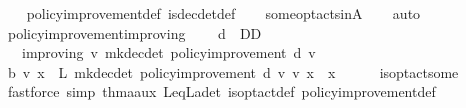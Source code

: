 \begin{isabellebody}
%
\isadelimproof
\ \ %
\endisadelimproof
%
\isatagproof
{}\isamarkupfalse%
\ policy{\isacharunderscore}{\kern0pt}improvement{\isacharunderscore}{\kern0pt}def\ is{\isacharunderscore}{\kern0pt}dec{\isacharunderscore}{\kern0pt}det{\isacharunderscore}{\kern0pt}def\isanewline
\ \ \isamarkupfalse%
\ some{\isacharunderscore}{\kern0pt}opt{\isacharunderscore}{\kern0pt}acts{\isacharunderscore}{\kern0pt}in{\isacharunderscore}{\kern0pt}A\isanewline
\ \ \isamarkupfalse%
\ auto%
\endisatagproof
{\isafoldproof}%
%
\isadelimproof
\isanewline
%
\endisadelimproof
\isanewline
{}\isamarkupfalse%
\ policy{\isacharunderscore}{\kern0pt}improvement{\isacharunderscore}{\kern0pt}improving{\isacharcolon}{\kern0pt}\ \isanewline
\ \ \ {\isachardoublequoteopen}d\ {\isasymin}\ D\isactrlsub D{\isachardoublequoteclose}\ \isanewline
\ \ \ {\isachardoublequoteopen}{\isasymnu}{\isacharunderscore}{\kern0pt}improving\ v\ {\isacharparenleft}{\kern0pt}mk{\isacharunderscore}{\kern0pt}dec{\isacharunderscore}{\kern0pt}det\ {\isacharparenleft}{\kern0pt}policy{\isacharunderscore}{\kern0pt}improvement\ d\ v{\isacharparenright}{\kern0pt}{\isacharparenright}{\kern0pt}{\isachardoublequoteclose}\isanewline
%
\isadelimproof
%
\endisadelimproof
%
\isatagproof
{}\isamarkupfalse%
\ {\isacharminus}{\kern0pt}\isanewline
\ \ \isamarkupfalse%
\ {\isachardoublequoteopen}{\isasymL}\isactrlsub b\ v\ x\ {\isacharequal}{\kern0pt}\ L\ {\isacharparenleft}{\kern0pt}mk{\isacharunderscore}{\kern0pt}dec{\isacharunderscore}{\kern0pt}det\ {\isacharparenleft}{\kern0pt}policy{\isacharunderscore}{\kern0pt}improvement\ d\ v{\isacharparenright}{\kern0pt}{\isacharparenright}{\kern0pt}\ v\ x{\isachardoublequoteclose}\ \ x\isanewline
\ \ \ \ \isamarkupfalse%
\ is{\isacharunderscore}{\kern0pt}opt{\isacharunderscore}{\kern0pt}act{\isacharunderscore}{\kern0pt}some\isanewline
\ \ \ \ \isamarkupfalse%
\ {\isacharparenleft}{\kern0pt}fastforce\ simp{\isacharcolon}{\kern0pt}\ thm{\isacharunderscore}{\kern0pt}{}{\isacharunderscore}{\kern0pt}{}{\isacharunderscore}{\kern0pt}{}{}{\isacharunderscore}{\kern0pt}a{\isacharunderscore}{\kern0pt}aux{\isacharprime}{\kern0pt}\ L{\isacharunderscore}{\kern0pt}eq{\isacharunderscore}{\kern0pt}L\isactrlsub a{\isacharunderscore}{\kern0pt}det\ is{\isacharunderscore}{\kern0pt}opt{\isacharunderscore}{\kern0pt}act{\isacharunderscore}{\kern0pt}def\ policy{\isacharunderscore}{\kern0pt}improvement{\isacharunderscore}{\kern0pt}def\isanewline

\end{isabellebody}

